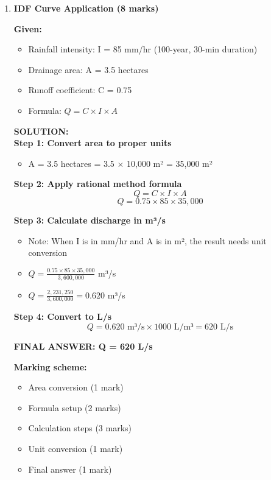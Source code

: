 \documentclass[11pt,a4paper]{article}
\newenvironment{solutionbox}
    {\color{solution}\begin{framed}\textbf{SOLUTION:}\\\vspace{0.2cm}}
    {\end{framed}}
\begin{document}
\begin{enumerate}

\item \textbf{IDF Curve Application (8 marks)}

\textbf{Given:}
\begin{itemize}[nosep]
    \item Rainfall intensity: I = 85 mm/hr (100-year, 30-min duration)
    \item Drainage area: A = 3.5 hectares
    \item Runoff coefficient: C = 0.75
    \item Formula: $Q = C \times I \times A$
\end{itemize}

\begin{solutionbox}
\textbf{Step 1: Convert area to proper units}
\begin{itemize}[nosep]
    \item A = 3.5 hectares = 3.5 × 10,000 m² = 35,000 m²
\end{itemize}

\textbf{Step 2: Apply rational method formula}
$$Q = C \times I \times A$$
$$Q = 0.75 \times 85 \times 35,000$$

\textbf{Step 3: Calculate discharge in m³/s}
\begin{itemize}[nosep]
    \item Note: When I is in mm/hr and A is in m², the result needs unit conversion
    \item $Q = \frac{0.75 \times 85 \times 35,000}{3,600,000}$ m³/s
    \item $Q = \frac{2,231,250}{3,600,000} = 0.620$ m³/s
\end{itemize}

\textbf{Step 4: Convert to L/s}
$$Q = 0.620 \text{ m³/s} \times 1000 \text{ L/m³} = 620 \text{ L/s}$$

\textbf{FINAL ANSWER: Q = 620 L/s}

\textbf{Marking scheme:}
\begin{itemize}[nosep]
    \item Area conversion (1 mark)
    \item Formula setup (2 marks)
    \item Calculation steps (3 marks)
    \item Unit conversion (1 mark)
    \item Final answer (1 mark)
\end{itemize}
\end{solutionbox}


\end{enumerate}
\end{document}
